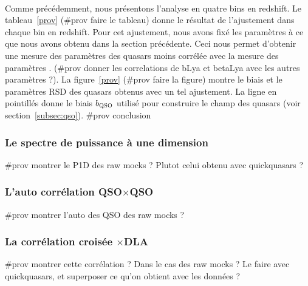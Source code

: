 \documentclass[11pt, twoside, a4paper, openright]{report}
\begin{document}
\paragraph{}
Comme précédemment, nous présentons l'analyse en quatre bins en redshift.
Le tableau~\ref{prov} (\#prov faire le tableau) donne le résultat de l'ajustement dans chaque bin en redshift. Pour cet ajustement, nous avons fixé les paramètres \lya{} à ce que nous avons obtenu dans la section précédente. Ceci nous permet d'obtenir une mesure des paramètres des quasars moins corrélée avec la mesure des paramètres \lya{}. (\#prov donner les correlations de bLya et betaLya avec les autres paramètres ?).
La figure~\ref{prov} (\#prov faire la figure) montre le biais et le paramètres RSD des quasars obtenus avec un tel ajustement.
La ligne en pointillés donne le biais $b_{\textsc{QSO}}$ utilisé pour construire le champ des quasars (voir section~\ref{subsec:qso}).
\#prov conclusion



\subsubsection{Le spectre de puissance à une dimension}

\#prov montrer le P1D des raw mocks ? Plutot celui obtenu avec quickquasars ? 


\subsubsection{L'auto corrélation QSO$\times$QSO}

\#prov montrer l'auto des QSO des raw mocks ? 


\subsubsection{La corrélation croisée \lya$\times$DLA}

\#prov montrer cette corrélation ? Dans le cas des raw mocks ?
Le faire avec quickquasars, et superposer ce qu'on obtient avec les données ?
\end{document}
